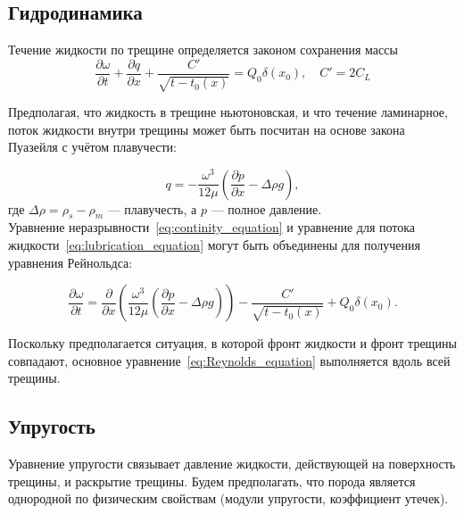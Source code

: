 \documentclass[11pt,a4paper,russian,dvipsnames ]{article}
\begin{document}
\subsection{Гидродинамика}
Течение жидкости по трещине определяется законом сохранения массы %
\begin{equation}\label{eq:continity_equation}
	\frac{\partial \omega}{\partial t} + \frac{\partial q}{\partial x} + \frac{C'}{\sqrt{t-t_{0}(x)}} = Q_{0}\delta(x_{0}), \quad C'=2C_{L}
\end{equation}


Предполагая, что жидкость в трещине ньютоновская, и что течение ламинарное, поток жидкости внутри трещины может быть посчитан на основе закона Пуазейля с учётом плавучести:

\begin{equation}\label{eq:lubrication_equation}
	q=-\frac{\omega^{3}}{12\mu}\left(\frac{\partial p}{\partial x}-\Delta\rho g\right), 
\end{equation}
где $\Delta \rho=\rho_{s}-\rho_{m}$ --- плавучесть, а $p$ --- полное давление. \\

Уравнение неразрывности~\eqref{eq:continity_equation} и уравнение для потока жидкости~\eqref{eq:lubrication_equation} могут быть объединены для получения уравнения Рейнольдса:

\begin{equation}\label{eq:Reynolds_equation}
	\frac{\partial \omega}{\partial t} = \frac{\partial }{\partial x}\left( \frac{\omega^{3}}{12\mu}\left(\frac{\partial p}{\partial x}-\Delta\rho g\right) \right) - \frac{C'}{\sqrt{t-t_{0}(x)}} + Q_{0}\delta(x_{0}).
\end{equation}

Поскольку предполагается ситуация, в которой фронт жидкости и фронт трещины совпадают, основное уравнение~\eqref{eq:Reynolds_equation} выполняется вдоль всей трещины.

\subsection{Упругость}
Уравнение упругости связывает давление жидкости, действующей на поверхность трещины, и раскрытие трещины. 
Будем предполагать, что порода является однородной по физическим свойствам (модули упругости, коэффициент утечек).
\end{document}
